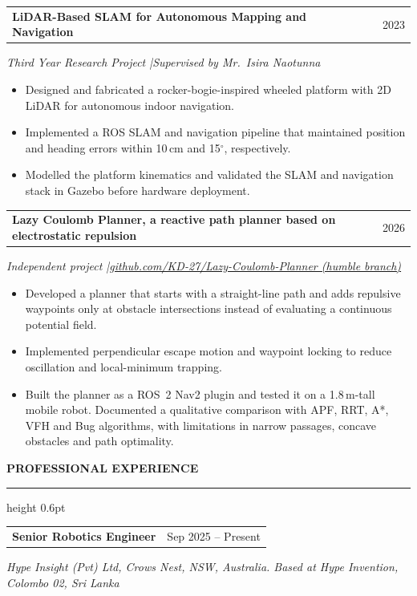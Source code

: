 \documentclass[11pt,letterpaper]{article}
\makeatletter
\renewcommand{\section}[1]{%
  \Needspace{6\baselineskip}%
  \vspace{7pt}%
  {\normalsize\bfseries\MakeUppercase{#1}}\par
  \vspace{1pt}\hrule height 0.6pt
  \vspace{3.5pt}%
}
\newcommand{\cventry}[2]{%
  \vspace{3pt}%
  \noindent\begin{tabularx}{\textwidth}{@{}X r@{}}
    #1 & #2
  \end{tabularx}\par\vspace{-0.5pt}%
}
\newcommand{\cvsub}[1]{{\itshape #1}\par\vspace{1pt}}
\newenvironment{cvlist}
  {\begin{itemize}[leftmargin=1.1em,itemsep=1pt,parsep=0pt,topsep=1.5pt,
                   label=\textendash]}
  {\end{itemize}}
\makeatother
\begin{document}
\cventry{\textbf{LiDAR-Based SLAM for Autonomous Mapping and Navigation}}{2023}
\cvsub{Third Year Research Project \quad|\quad Supervised by Mr.\ Isira Naotunna}
\begin{cvlist}
  \item Designed and fabricated a rocker-bogie-inspired wheeled platform with
        2D LiDAR for autonomous indoor navigation.
  \item Implemented a ROS SLAM and navigation pipeline that maintained position
        and heading errors within 10\,cm and 15$^\circ$, respectively.
  \item Modelled the platform kinematics and validated the SLAM and navigation
        stack in Gazebo before hardware deployment.
\end{cvlist}

\cventry{\textbf{Lazy Coulomb Planner, a reactive path planner based on electrostatic repulsion}}{2026}
\cvsub{Independent project \quad|\quad \href{https://github.com/KD-27/Lazy-Coulomb-Planner/tree/humble}{github.com/KD-27/Lazy-Coulomb-Planner (humble branch)}}
\begin{cvlist}
  \item Developed a planner that starts with a straight-line path and adds
        repulsive waypoints only at obstacle intersections instead of
        evaluating a continuous potential field.
  \item Implemented perpendicular escape motion and waypoint locking to reduce
        oscillation and local-minimum trapping.
  \item Built the planner as a ROS~2 Nav2 plugin and tested it on a 1.8\,m-tall
        mobile robot. Documented a qualitative comparison with APF, RRT, A*, VFH
        and Bug algorithms, with limitations in narrow passages, concave
        obstacles and path optimality.
\end{cvlist}

\section{Professional Experience}

\cventry{\textbf{Senior Robotics Engineer}}{Sep 2025 -- Present}
\cvsub{Hype Insight (Pvt) Ltd, Crows Nest, NSW, Australia. Based at Hype Invention, Colombo 02, Sri Lanka}
\end{document}

